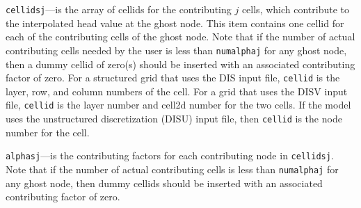 \item \texttt{cellidsj}---is the array of cellids for the contributing $j$ cells,  which contribute to the interpolated head value at the ghost node. This item contains one cellid for each of the contributing cells of the ghost node. Note that if the number of actual contributing cells needed by the user is less than \texttt{numalphaj} for any ghost node, then a dummy cellid of zero(s) should be inserted with an associated contributing factor of zero. For a structured grid that uses the DIS input file, \texttt{cellid} is the layer, row, and column numbers of the cell.   For a grid that uses the DISV input file, \texttt{cellid} is the layer number and cell2d number for the two cells.  If the model uses the unstructured discretization (DISU) input file, then \texttt{cellid} is the node number for the cell.

\item \texttt{alphasj}---is the contributing factors for each contributing node in \texttt{cellidsj}. Note that if the number of actual contributing cells is less than \texttt{numalphaj} for any ghost node, then dummy cellids should be inserted with an associated contributing factor of zero.


